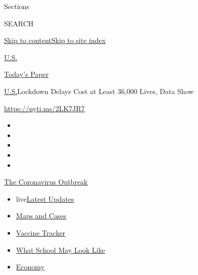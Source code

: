 Sections

SEARCH

\protect\hyperlink{site-content}{Skip to
content}\protect\hyperlink{site-index}{Skip to site index}

\href{https://www.nytimes.com/section/us}{U.S.}

\href{https://myaccount.nytimes.com/auth/login?response_type=cookie\&client_id=vi}{}

\href{https://www.nytimes.com/section/todayspaper}{Today's Paper}

\href{/section/us}{U.S.}\textbar{}Lockdown Delays Cost at Least 36,000
Lives, Data Show

\url{https://nyti.ms/2LK7JR7}

\begin{itemize}
\item
\item
\item
\item
\item
\end{itemize}

\href{https://www.nytimes.com/news-event/coronavirus?action=click\&pgtype=Article\&state=default\&region=TOP_BANNER\&context=storylines_menu}{The
Coronavirus Outbreak}

\begin{itemize}
\tightlist
\item
  live\href{https://www.nytimes.com/2020/08/01/world/coronavirus-covid-19.html?action=click\&pgtype=Article\&state=default\&region=TOP_BANNER\&context=storylines_menu}{Latest
  Updates}
\item
  \href{https://www.nytimes.com/interactive/2020/us/coronavirus-us-cases.html?action=click\&pgtype=Article\&state=default\&region=TOP_BANNER\&context=storylines_menu}{Maps
  and Cases}
\item
  \href{https://www.nytimes.com/interactive/2020/science/coronavirus-vaccine-tracker.html?action=click\&pgtype=Article\&state=default\&region=TOP_BANNER\&context=storylines_menu}{Vaccine
  Tracker}
\item
  \href{https://www.nytimes.com/interactive/2020/07/29/us/schools-reopening-coronavirus.html?action=click\&pgtype=Article\&state=default\&region=TOP_BANNER\&context=storylines_menu}{What
  School May Look Like}
\item
  \href{https://www.nytimes.com/live/2020/07/31/business/stock-market-today-coronavirus?action=click\&pgtype=Article\&state=default\&region=TOP_BANNER\&context=storylines_menu}{Economy}
\end{itemize}

